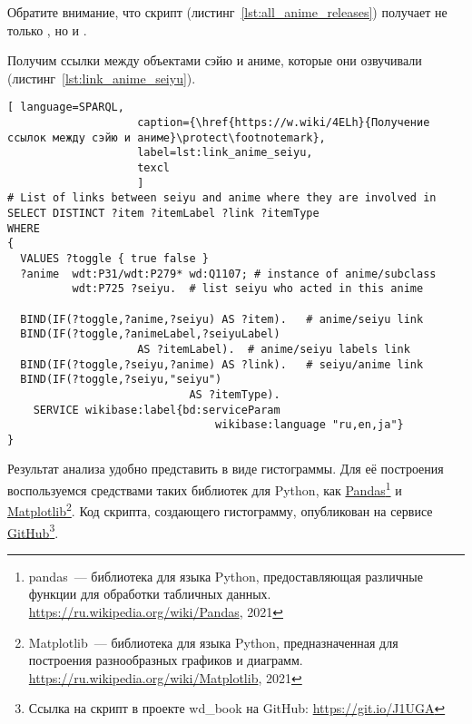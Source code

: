 Обратите внимание, что скрипт (листинг~\ref{lst:all_anime_releases}) получает не только  , но и . 

Получим ссылки между объектами сэйю и аниме, которые они озвучивали (листинг~\ref{lst:link_anime_seiyu}).

\begin{lstlisting}[ language=SPARQL, 
                    caption={\href{https://w.wiki/4ELh}{Получение ссылок между сэйю и аниме}\protect\footnotemark},
                    label=lst:link_anime_seiyu,
                    texcl 
                    ]
# List of links between seiyu and anime where they are involved in
SELECT DISTINCT ?item ?itemLabel ?link ?itemType
WHERE
{
  VALUES ?toggle { true false }
  ?anime  wdt:P31/wdt:P279* wd:Q1107; # instance of anime/subclass
          wdt:P725 ?seiyu.  # list seiyu who acted in this anime
  
  BIND(IF(?toggle,?anime,?seiyu) AS ?item).   # anime/seiyu link
  BIND(IF(?toggle,?animeLabel,?seiyuLabel)
					AS ?itemLabel).  # anime/seiyu labels link
  BIND(IF(?toggle,?seiyu,?anime) AS ?link).   # seiyu/anime link
  BIND(IF(?toggle,?seiyu,"seiyu")
							AS ?itemType).
    SERVICE wikibase:label{bd:serviceParam
					     		wikibase:language "ru,en,ja"}
}
\end{lstlisting}%

Результат анализа удобно представить в виде гистограммы. Для её построения воспользуемся средствами таких библиотек для Python, как \href{https://ru.wikipedia.org/wiki/Pandas}{Pandas}\footnote[][-5cm]{pandas~--- библиотека для языка Python, предоставляющая различные функции для обработки табличных данных. \href{https://ru.wikipedia.org/wiki/Pandas}{https://ru.wikipedia.org/wiki/Pandas}, 2021} и \href{https://ru.wikipedia.org/wiki/Matplotlib}{Matplotlib}\footnote[][-2.7cm]{Matplotlib~--- библиотека для языка Python, предназначенная для построения разнообразных графиков и диаграмм. \href{https://ru.wikipedia.org/wiki/Matplotlib}{https://ru.wikipedia.org/wiki/Matplotlib}, 2021}. Код скрипта, создающего гистограмму, опубликован на сервисе \href{https://git.io/J1UGA}{GitHub}\footnote{Ссылка на скрипт в проекте wd\_book на GitHub: \href{https://git.io/J1UGA}{https://git.io/J1UGA}}.

